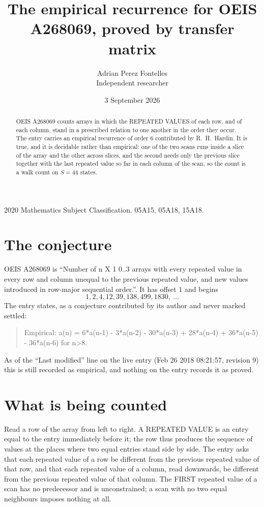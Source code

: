\documentclass[11pt,a4paper]{article}
\title{The empirical recurrence for OEIS A268069, proved by transfer matrix}
\author{Adrian Perez Fontelles\\ \small Independent researcher}
\date{3 September 2026}
\theoremstyle{plain}
\theoremstyle{definition}
\begin{document}
\maketitle

\begin{abstract}
OEIS A268069 counts arrays in which the REPEATED VALUES of each row, and of each column, stand in a
prescribed relation to one another in the order they occur. The entry carries an empirical
recurrence of order $6$ contributed by R.~H.~Hardin. It is true, and it is decidable
rather than empirical: one of the two scans runs inside a slice of the array and the other
across slices, and the second needs only the previous slice together with the last repeated
value so far in each column of the scan, so the count is a walk count on $S=44$ states.
\end{abstract}

\noindent\small 2020 Mathematics Subject Classification. 05A15, 05A18, 15A18.\normalsize

\section{The conjecture}

OEIS A268069 is ``Number of n X 1 0..3 arrays with every repeated value in every row and column unequal to the previous repeated value, and new values introduced in row-major sequential order.''. It has offset $1$ and begins
\[
1, 2, 4, 12, 39, 138, 499, 1830,\ \dots
\]
The entry states, as a conjecture contributed by its author and never marked settled:
\begin{quote}
Empirical: a(n) = 6*a(n-1) - 3*a(n-2) - 30*a(n-3) + 28*a(n-4) + 36*a(n-5) - 36*a(n-6) for n>8.
\end{quote}
As of the ``Last modified'' line on the live entry (Feb 26 2018 08:21:57, revision 9) this is still
recorded as empirical, and nothing on the entry records it as proved.

\section{What is being counted}

Read a row of the array from left to right. A REPEATED VALUE is an entry equal to the entry
immediately before it; the row thus produces the sequence of values at the places where two
equal entries stand side by side. The entry asks that each repeated value of a row be
different from the previous repeated value of that row, and that each repeated value of a column,
read downwards, be different from the previous repeated value of that column. The FIRST repeated
value of a scan has no predecessor and is unconstrained; a scan with no two equal neighbours
imposes nothing at all.
\end{document}
